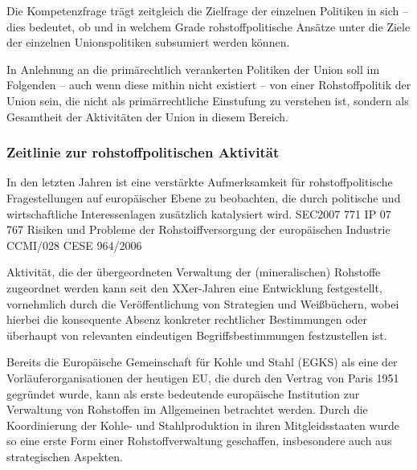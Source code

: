 \documentclass[12pt,a4paper,oneside]{book} %
\begin{document}
Die Kompetenzfrage trägt zeitgleich die Zielfrage der einzelnen Politiken in sich -- dies bedeutet, ob und in welchem Grade rohstoffpolitische Ansätze unter die Ziele der einzelnen Unionspolitiken subsumiert werden können.

In Anlehnung an die primärechtlich verankerten Politiken der Union soll im Folgenden -- auch wenn diese mithin nicht existiert -- von einer Rohstoffpolitik der Union sein, die nicht als primärrechtliche Einstufung zu verstehen ist, sondern als Gesamtheit der Aktivitäten der Union in diesem Bereich.
	
\subsubsection{Zeitlinie zur rohstoffpolitischen Aktivität}
	
In den letzten Jahren ist eine verstärkte Aufmerksamkeit für rohstoffpolitische Fragestellungen auf europäischer Ebene zu beobachten, die durch politische und wirtschaftliche Interessenlagen zusätzlich katalysiert wird.
SEC2007 771
IP 07 767
Risiken und Probleme der Rohstoiffversorgung der europäischen Industrie CCMI/028 CESE 964/2006

Aktivität, die der übergeordneten Verwaltung der (mineralischen) Rohstoffe zugeordnet werden kann seit den XXer-Jahren eine Entwicklung festgestellt, vornehmlich durch die Veröffentlichung von Strategien und Weißbüchern, wobei hierbei die konsequente Absenz konkreter rechtlicher Bestimmungen oder überhaupt von relevanten eindeutigen Begriffsbestimmungen festzustellen ist.
	
Bereits die Europäische Gemeinschaft für Kohle und Stahl (EGKS) als eine der Vorläuferorganisationen der heutigen EU, die durch den Vertrag von Paris 1951 gegründet wurde, kann als erste bedeutende europäische Institution zur Verwaltung von Rohstoffen im Allgemeinen betrachtet werden. Durch die Koordinierung der Kohle- und Stahlproduktion in ihren Mitgleidsstaaten wurde so eine erste Form einer Rohstoffverwaltung geschaffen, insbesondere auch aus strategischen Aspekten.%
\end{document}
